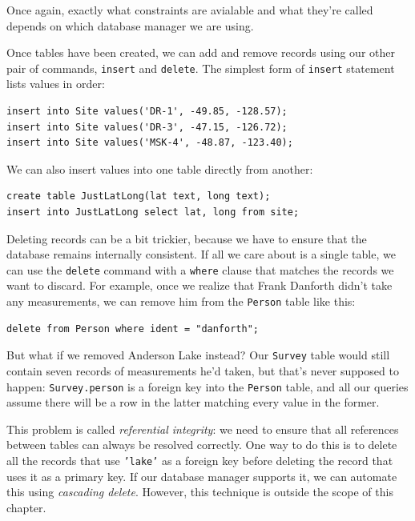 \documentclass[]{book}
\newcommand{\gdef}[2]{\emph{#2}}
\begin{document}
Once again, exactly what constraints are avialable and what they're
called depends on which database manager we are using.

Once tables have been created, we can add and remove records using our
other pair of commands, \texttt{insert} and \texttt{delete}. The
simplest form of \texttt{insert} statement lists values in order:

\begin{verbatim}
insert into Site values('DR-1', -49.85, -128.57);
insert into Site values('DR-3', -47.15, -126.72);
insert into Site values('MSK-4', -48.87, -123.40);
\end{verbatim}

We can also insert values into one table directly from another:

\begin{verbatim}
create table JustLatLong(lat text, long text);
insert into JustLatLong select lat, long from site;
\end{verbatim}

Deleting records can be a bit trickier, because we have to ensure that
the database remains internally consistent. If all we care about is a
single table, we can use the \texttt{delete} command with a
\texttt{where} clause that matches the records we want to discard. For
example, once we realize that Frank Danforth didn't take any
measurements, we can remove him from the \texttt{Person} table like
this:

\begin{verbatim}
delete from Person where ident = "danforth";
\end{verbatim}

But what if we removed Anderson Lake instead? Our \texttt{Survey} table
would still contain seven records of measurements he'd taken, but that's
never supposed to happen: \texttt{Survey.person} is a foreign key into
the \texttt{Person} table, and all our queries assume there will be a
row in the latter matching every value in the former.

This problem is called \gdef{g:referential-integrity}{referential
integrity}: we need to ensure that all references between tables can
always be resolved correctly. One way to do this is to delete all the
records that use \texttt{'lake'} as a foreign key before deleting the
record that uses it as a primary key. If our database manager supports
it, we can automate this using \gdef{g:cascading-delete}{cascading
delete}. However, this technique is outside the scope of this chapter.
\end{document}

